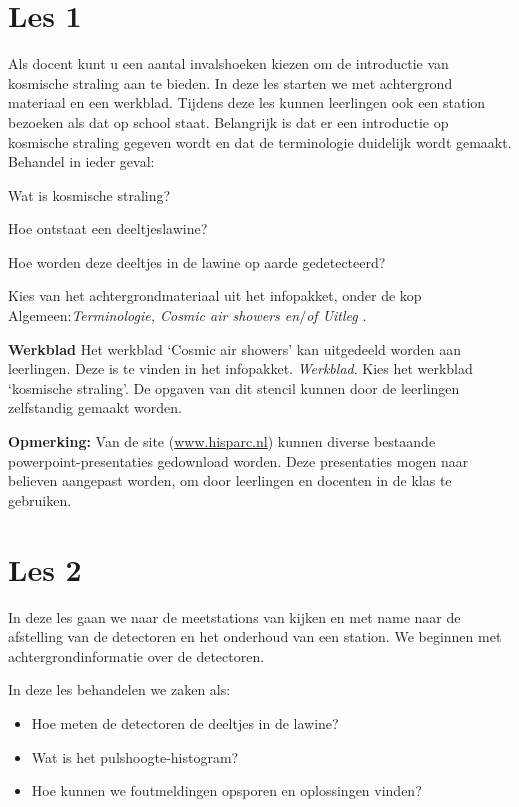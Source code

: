 \section{Les 1}

Als docent kunt u een aantal invalshoeken kiezen om de introductie van
kosmische straling aan te bieden.  In deze les starten we met
achtergrond materiaal en een werkblad. Tijdens deze les kunnen
leerlingen ook een station bezoeken als dat op school staat. Belangrijk
is dat er een introductie op kosmische straling gegeven wordt en dat de
terminologie duidelijk wordt gemaakt.
Behandel in ieder geval:
\begin{description}
    \item{Wat is kosmische straling?}
    \item{Hoe ontstaat een deeltjeslawine?}
    \item{Hoe worden deze deeltjes in de lawine op aarde gedetecteerd?}
\end{description}
Kies van het achtergrondmateriaal uit het infopakket, onder de kop
Algemeen:\textit{Terminologie, Cosmic air showers en$/$of Uitleg \hisparc}.

\textbf{Werkblad} Het werkblad `Cosmic air showers' kan uitgedeeld worden aan
leerlingen. Deze is te vinden in het infopakket.
\textit{Werkblad}. Kies het werkblad `kosmische straling'.
De opgaven van dit stencil kunnen door de leerlingen zelfstandig gemaakt worden.

\textbf{Opmerking:}
Van de \hisparc site (\url{www.hisparc.nl}) kunnen diverse bestaande powerpoint-presentaties
gedownload worden.
Deze presentaties mogen naar believen aangepast worden, om door leerlingen en docenten
in de klas te gebruiken.

\section{Les 2}
In deze les gaan we naar de meetstations van \hisparc kijken en met name naar de
afstelling van de detectoren en het onderhoud van een station.
We beginnen met achtergrondinformatie over de detectoren.

In deze les behandelen we zaken als:
\begin{itemize}
    \item Hoe meten de detectoren de deeltjes in de lawine?
    \item Wat is het pulshoogte-histogram?
    \item Hoe kunnen we foutmeldingen opsporen en oplossingen vinden?
\end{itemize}

